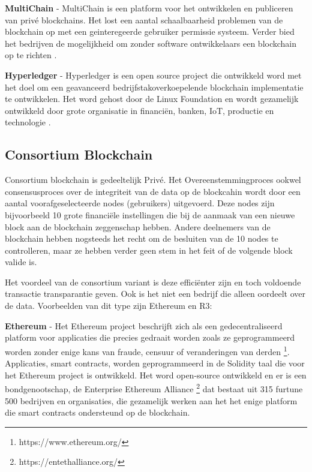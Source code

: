 \textbf{MultiChain} - MultiChain is een platform voor het ontwikkelen en publiceren van privé blockchains. Het lost een aantal schaalbaarheid problemen \cite{oreillyScalability} van de blockchain op met een geinteregeerde gebruiker permissie systeem. Verder bied het bedrijven de mogelijkheid om zonder software ontwikkelaars een blockchain op te richten \cite{mutlichain}.

\textbf{Hyperledger} - Hyperledger is een open source project die ontwikkeld word met het doel om een geavanceerd bedrijfstakoverkoepelende blockchain implementatie te ontwikkelen. Het word gehost door de Linux Foundation \cite{linuxFoundation} en wordt gezamelijk ontwikkeld door grote organisatie in financiën, banken, IoT, productie en technologie \cite{hyperledger}. 

\subsection{Consortium Blockchain}
Consortium blockchain is gedeeltelijk Privé. Het Overeenstemmingproces ookwel consensusproces over de integriteit van de data op de blockcahin wordt door een aantal voorafgeselecteerde nodes (gebruikers) uitgevoerd. Deze nodes zijn bijvoorbeeld 10 grote financiële instellingen die bij de aanmaak van een nieuwe block aan de blockchain zeggenschap hebben. Andere deelnemers van de blockchain hebben nogsteeds het recht om de besluiten van de 10 nodes te controlleren, maar ze hebben verder geen stem in het feit of de volgende block valide is.\par

Het voordeel van de consortium variant is deze efficiënter zijn en toch voldoende transactie transparantie geven. Ook is het niet een bedrijf die alleen oordeelt over de data. Voorbeelden van dit type zijn Ethereum en R3:

\textbf{Ethereum} - Het Ethereum project beschrijft zich als een gedecentraliseerd platform voor applicaties die precies gedraait worden zoals ze geprogrammeerd worden zonder enige kans van fraude, censuur of veranderingen van derden \footnote{https://www.ethereum.org/}. Applicaties, smart contracts, worden geprogrammeerd in de Solidity taal die voor het Ethereum project is ontwikkeld. Het word open-source ontwikkeld en er is een bondgenootschap, de Enterprise Ethereum Alliance \footnote{https://entethalliance.org/} dat bestaat uit 315 furtune 500 bedrijven en organisaties, die gezamelijk werken aan het het enige platform die smart contracts ondersteund op de blockchain.\cite{ethWood}\par

